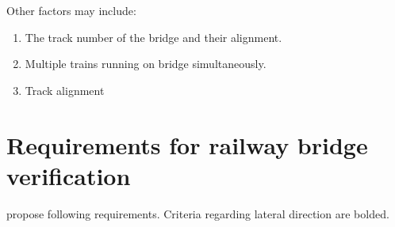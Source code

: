 \begin{appendices}
\vspace*{0.2cm}

Other factors may include:

\begin{enumerate}

	\item The track number of the bridge and their alignment. 
	\item Multiple trains running on bridge simultaneously. 
	\item Track alignment

\end{enumerate}

\section{Requirements for railway bridge verification}
\citet{EC0} propose following requirements. Criteria regarding lateral direction are bolded.



\end{appendices}
